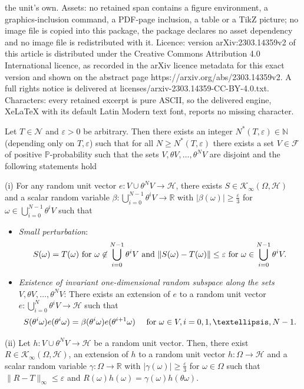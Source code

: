 \documentclass[10pt,a4paper]{amsart}
\newcommand{\N}{\mathbb{N}}
\newcommand{\R}{\mathbb{R}}
\newcommand{\cH}{\mathcal{H}}
\newcommand{\cK}{\mathcal{K}}
\newcommand{\eps}{\varepsilon}
\newcommand{\mP}{\mathbb{P}}
\begin{document}
the unit's own. Assets: no retained span contains a figure environment, a graphics-inclusion command, a PDF-page inclusion, a table or a TikZ picture; no image file is copied into this package, the package declares no asset dependency and no image file is redistributed with it. Licence: version arXiv:2303.14359v2 of this article is distributed under the Creative Commons Attribution 4.0 International licence, as recorded in the arXiv licence metadata for this exact version and shown on the abstract page https://arxiv.org/abs/2303.14359v2. A full rights notice is delivered at licenses/arxiv-2303.14359-CC-BY-4.0.txt. Characters: every retained excerpt is pure ASCII, so the delivered engine, XeLaTeX with its default Latin Modern text font, reports no missing character.
\begin{proposition}\label{TechnicalProposition_1} Let $T\in\mathcal N$ and $\eps>0$ be arbitrary. Then  there exists an integer $N^*(T,\eps)\in\N$ (depending only on $T,\eps$) such that for all $N\geq N^*(T,\eps)$ there exists  a set $V\in\mathcal F$ of positive $\mP$-probability such that the sets $V,\theta V,\dots, \theta^N V$ are disjoint and the following statements hold

\noindent
(i) For any random unit vector $e:V\cup \theta^N V\rightarrow \mathcal H$, there exists $S\in\mathcal K_{\infty}(\Omega,\mathcal H)$ and a scalar random variable $\beta:\bigcup_{i=0}^{N-1}\theta^i V\rightarrow\R$ with $|\beta(\omega)|\geq \frac{\eps}{3}$ for $\omega\in \bigcup_{i=0}^{N-1}\theta^i V$ such that 
\begin{itemize}
\item [(p1)] \emph{Small perturbation}:
\[
S(\omega)=T(\omega)\hbox{ for } \omega\not\in \bigcup_{i=0}^{N-1}\theta^i V
\hbox{ and } \|S(\omega)- T(\omega)\|\leq \eps\hbox{ for } \omega\in \bigcup_{i=0}^{N-1}\theta^i V.	
\]
\item [(p2)] \emph{Existence of invariant one-dimensional random subspace along the sets $V,\theta V,\dots, \theta^N V$}: There exists an extension of $e$ to a random unit vector $e:\bigcup_{i=0}^N\theta^i V\rightarrow \cH$ such that
\[
S(\theta^i\omega)e(\theta^i\omega)=\beta(\theta^i\omega)e(\theta^{i+1}\omega)\quad \hbox{ for } \omega\in V, i=0,1,\dots,N-1.
\]
\end{itemize}

\noindent 
(ii) Let  $h:V\cup\theta^N V\rightarrow \cH$ be a random unit vector. Then, there exist $R \in \cK_{\infty}(\Omega,\cH)$, an extension of $h$ to a random unit vector $h:\Omega\rightarrow \cH$ and a scalar random variable $\gamma:\Omega\rightarrow \mathbb R$ with $|\gamma(\omega)|\geq \frac{\eps}{3}$ for $\omega\in\Omega$ such that $\|R-T\|_{\infty}\leq \eps$ and $R(\omega) h(\omega)=\gamma(\omega)h(\theta\omega)$.



\end{proposition}
\end{document}
